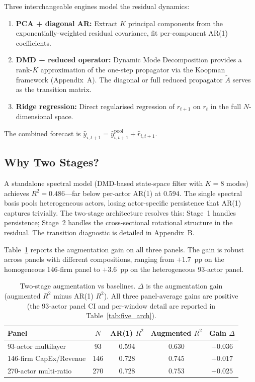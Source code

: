 \documentclass[11pt,a4paper]{article}
\begin{document}
Three interchangeable engines model the residual dynamics:
\begin{enumerate}[nosep]
  \item \textbf{PCA + diagonal AR:} Extract $K$ principal components from the exponentially-weighted residual covariance, fit per-component AR(1) coefficients.
  \item \textbf{DMD + reduced operator:} Dynamic Mode Decomposition provides a rank-$K$ approximation of the one-step propagator via the Koopman framework (Appendix~A). The diagonal or full reduced propagator $\tilde{A}$ serves as the transition matrix.
  \item \textbf{Ridge regression:} Direct regularised regression of $r_{t+1}$ on $r_t$ in the full $N$-dimensional space.
\end{enumerate}

The combined forecast is $\hat{y}_{i,t+1} = \hat{y}^{\mathrm{pool}}_{i,t+1} + \hat{r}_{i,t+1}$.

\subsection{Why Two Stages?}

A standalone spectral model (DMD-based state-space filter with $K = 8$ modes) achieves $R^2 = 0.486$---far below per-actor AR(1) at 0.594. The single spectral basis pools heterogeneous actors, losing actor-specific persistence that AR(1) captures trivially. The two-stage architecture resolves this: Stage~1 handles persistence; Stage~2 handles the cross-sectional rotational structure in the residual. The transition diagnostic is detailed in Appendix~B.

Table~\ref{tab:augmentation} reports the augmentation gain on all three panels. The gain is robust across panels with different compositions, ranging from $+1.7$~pp on the homogeneous 146-firm panel to $+3.6$~pp on the heterogeneous 93-actor panel.

\begin{table}[ht]
\centering
\caption{Two-stage augmentation vs baselines. $\Delta$ is the augmentation gain (augmented $R^2$ minus AR(1) $R^2$). All three panel-average gains are positive (the 93-actor panel CI and per-window detail are reported in Table~\ref{tab:five_arch}).}
\label{tab:augmentation}
\small
\begin{tabular}{lcccc}
\toprule
Panel & $N$ & AR(1) $R^2$ & Augmented $R^2$ & Gain $\Delta$ \\
\midrule
93-actor multilayer & 93 & 0.594 & 0.630 & $+0.036$ \\
146-firm CapEx/Revenue & 146 & 0.728 & 0.745 & $+0.017$ \\
270-actor multi-ratio & 270 & 0.728 & 0.753 & $+0.025$ \\
\bottomrule
\end{tabular}
\end{table}
\end{document}
